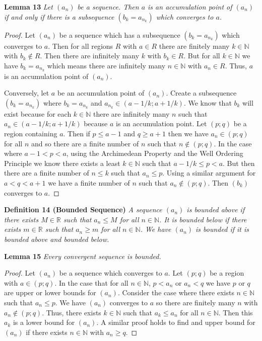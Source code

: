 \documentclass{article}
\begin{document}
\begin{flushleft}
\textbf{Lemma 13}
\textsl{Let $(a_n)$ be a sequence. Then $a$ is an accumulation point of $(a_n)$ if and only if there is a subsequence $(b_k = a_{n_k})$ which converges to $a$.}
\begin{proof}
Let $(a_n)$ be a sequence which has a subsequence $(b_k = a_{n_k})$ which converges to $a$. Then for all regions $R$ with $a \in R$ there are finitely many $k \in \mathbb{N}$ with $b_k \notin R$. Then there are infinitely many $k$ with $b_k \in R$. But for all $k \in \mathbb{N}$ we have $b_k = a_{n_k}$ which means there are infinitely many $n \in \mathbb{N}$ with $a_n \in R$. Thus, $a$ is an accumulation point of $(a_n)$.\newline

Conversely, let $a$ be an accumulation point of $(a_n)$. Create a subsequence $(b_k = a_{n_k})$ where $b_k = a_{n_k}$ and $a_{n_k} \in (a - 1/k ; a + 1/k)$. We know that $b_k$ will exist because for each $k \in \mathbb{N}$ there are infinitely many $n$ such that $a_n \in (a - 1/k ; a + 1/k)$ because $a$ is an accumulation point. Let $(p;q)$ be a region containing $a$. Then if $p \leq a - 1$ and $q \geq a + 1$ then we have $a_n \in (p;q)$ for all $n$ and so there are a finite number of $n$ such that $n \notin (p;q)$. In the case where $a - 1 < p < a$, using the Archimedean Property and the Well Ordering Principle we know there exists a least $k \in \mathbb{N}$ such that $a-1/k \leq p < a$. But then there are a finite number of $n \leq k$ such that $a_n \leq p$. Using a similar argument for $a < q < a + 1$ we have a finite number of $n$ such that $a_n \notin (p;q)$. Then $(b_k)$ converges to $a$.
\end{proof}

\textbf{Definition 14 (Bounded Sequence)}
\textsl{A sequence $(a_n)$ is bounded above if there exists $M \in \mathbb{R}$ such that $a_n \leq M$ for all $n \in \mathbb{N}$. It is bounded below if there exists $m \in \mathbb{R}$ such that $a_n \geq m$ for all $n \in \mathbb{N}$. We have $(a_n)$ is bounded if it is bounded above and bounded below.}\newline

\textbf{Lemma 15}
\textsl{Every convergent sequence is bounded.}
\begin{proof}
Let $(a_n)$ be a sequence which converges to $a$. Let $(p;q)$ be a region with $a \in (p;q)$. In the case that for all $n \in \mathbb{N}$, $p < a_n$ or $a_n < q$ we have $p$ or $q$ are upper or lower bounds for $(a_n)$. Consider the case where there exists $n \in \mathbb{N}$ such that $a_n \leq p$. We have $(a_n)$ converges to $a$ so there are finitely many $n$ with $a_n \notin (p;q)$. Thus, there exists $k \in \mathbb{N}$ such that $a_k \leq a_n$ for all $n \in \mathbb{N}$. Then this $a_k$ is a lower bound for $(a_n)$. A similar proof holds to find and upper bound for $(a_n)$ if there exists $n \in \mathbb{N}$ with $a_n \geq q$.
\end{proof}


\end{flushleft}
\end{document}
